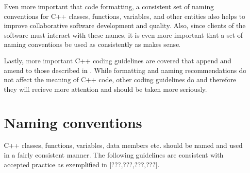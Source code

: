 %
%

Even more important that code formatting, a consistent set of naming
conventions for C++ classes, functions, variables, and other entities also
helps to improve collaborative software development and quality.  Also, since
clients of the software must interact with these names, it is even more
important that a set of naming conventions be used as consistently as makes
sense.

Lastly, more important C++ coding guidelines are covered that append and amend
to those described in {}\cite{C++CodingStandards05}.  While formatting and
naming recommendations do not affect the meaning of C++ code, other coding
guidelines do and therefore they will recieve more attention and should be
taken more seriously.

%
\section{Naming conventions}
%

C++ classes, functions, variables, data members etc. should be named and used
in a fairly consistent manner.  The following guidelines are consistent with
accepted practice as exemplified in [???,???,???,???].

